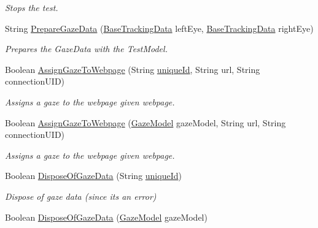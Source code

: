 \begin{DoxyCompactItemize}
\begin{DoxyCompactList}\small\item\em Stops the test. \end{DoxyCompactList}\item 
String \hyperlink{class_web_analyzer_1_1_controller_1_1_test_controller_a0a119110bce2d8627fda689c511b214c}{Prepare\+Gaze\+Data} (\hyperlink{class_web_analyzer_1_1_models_1_1_base_1_1_base_tracking_data}{Base\+Tracking\+Data} left\+Eye, \hyperlink{class_web_analyzer_1_1_models_1_1_base_1_1_base_tracking_data}{Base\+Tracking\+Data} right\+Eye)
\begin{DoxyCompactList}\small\item\em Prepares the Gaze\+Data with the Test\+Model. \end{DoxyCompactList}\item 
Boolean \hyperlink{class_web_analyzer_1_1_controller_1_1_test_controller_acce22c3c2a9e0741df6778055f234cbf}{Assign\+Gaze\+To\+Webpage} (String \hyperlink{_u_i_2_h_t_m_l_resources_2js_2lib_2underscore_8min_8js_af690ff5521d79c7128861033ae80ae17}{unique\+Id}, String url, String connection\+U\+I\+D)
\begin{DoxyCompactList}\small\item\em Assigns a gaze to the webpage given webpage. \end{DoxyCompactList}\item 
Boolean \hyperlink{class_web_analyzer_1_1_controller_1_1_test_controller_a8c6a47820f0c9e597ace7cf88029da0e}{Assign\+Gaze\+To\+Webpage} (\hyperlink{class_web_analyzer_1_1_models_1_1_data_model_1_1_gaze_model}{Gaze\+Model} gaze\+Model, String url, String connection\+U\+I\+D)
\begin{DoxyCompactList}\small\item\em Assigns a gaze to the webpage given webpage. \end{DoxyCompactList}\item 
Boolean \hyperlink{class_web_analyzer_1_1_controller_1_1_test_controller_ae88c0e776f3d18dc0c0cfc2106b2f1a5}{Dispose\+Of\+Gaze\+Data} (String \hyperlink{_u_i_2_h_t_m_l_resources_2js_2lib_2underscore_8min_8js_af690ff5521d79c7128861033ae80ae17}{unique\+Id})
\begin{DoxyCompactList}\small\item\em Dispose of gaze data (since its an error) \end{DoxyCompactList}\item 
Boolean \hyperlink{class_web_analyzer_1_1_controller_1_1_test_controller_a99b6f672f4ef0293ac70edb20e1c7cdb}{Dispose\+Of\+Gaze\+Data} (\hyperlink{class_web_analyzer_1_1_models_1_1_data_model_1_1_gaze_model}{Gaze\+Model} gaze\+Model)

\end{DoxyCompactItemize}

